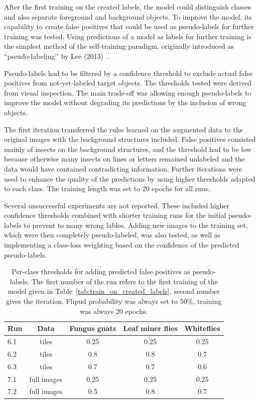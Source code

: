 \documentclass[12pt, a4paper]{article}
\begin{document}
After the first training on the created labels, the model could distinguish classes and also separate foreground and background objects. To improve the model, its capability to create false positives that could be used as pseudo-labels for further training was tested. Using predictions of a model as labels for further training is the simplest method of the self-training paradigm, originally introduced as “pseudo-labeling’’ by Lee (2013)~\cite{lee_pseudo-label_nodate}.

Pseudo-labels had to be filtered by a confidence threshold to exclude actual false positives from not-yet-labeled target objects. The thresholds tested were derived from visual inspection. The main trade-off was allowing enough pseudo-labels to improve the model without degrading its predictions by the inclusion of wrong objects.

The first iteration transferred the rules learned on the augmented data to the original images with the background structures included. False positives consisted mainly of insects on the background structures, and the threshold had to be low because otherwise many insects on lines or letters remained unlabeled and the data would have contained contradicting information. Further iterations were used to enhance the quality of the predictions by using higher thresholds adapted to each class. The training length was set to 20 epochs for all runs.

Several unsuccessful experiments are not reported. These included higher confidence thresholds combined with shorter training runs for the initial pseudo-labels to prevent to many wrong lables. Adding new images to the training set, which were then completely pseudo-labeled, was also tested, as well as implementing a class-loss weighting based on the confidence of the predicted pseudo-labels.

\begin{table}[!t]
    \centering
    \begin{tabular}{lcccc}
        \toprule
        Run & Data & Fungus gnats & Leaf miner flies & Whiteflies \\
        \midrule
        6.1 & tiles & 0.25 & 0.25 & 0.25 \\
        6.2 & tiles & 0.8  & 0.8  & 0.7  \\
        6.3 & tiles &  0.7  & 0.7  & 0.6  \\
        7.1 & full images & 0.25 & 0.25 & 0.25 \\
        7.2 & full  images & 0.5  & 0.8  & 0.7  \\
        \bottomrule
    \end{tabular}
    \caption{Per-class thresholds for adding predicted false positives as pseudo-labels. The first number of the run refers to the first training of the model given in Table~\ref{tab:train_on_created_labels}, second number gives the iteration. Flipud probability was always set to 50\%, training was always 20 epochs.}
    \label{tab:your_label}
\end{table}
\end{document}

